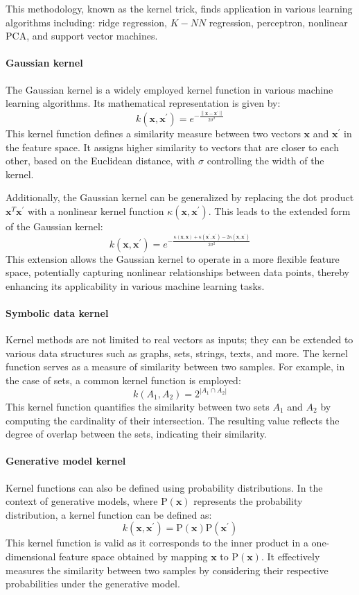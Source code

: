 This methodology, known as the kernel trick, finds application in various learning algorithms including: ridge regression, $K-NN$ regression, perceptron, nonlinear PCA, and support vector machines.

\paragraph*{Gaussian kernel}
The Gaussian kernel is a widely employed kernel function in various machine learning algorithms. 
Its mathematical representation is given by:
\[k(\textbf{x},\textbf{x}^\prime)=e^{-\frac{\left\lVert \textbf{x}-\textbf{x}^\prime\right\rVert}{2\sigma^2} }\]
This kernel function defines a similarity measure between two vectors $\textbf{x}$ and $\textbf{x}^\prime$ in the feature space. 
It assigns higher similarity to vectors that are closer to each other, based on the Euclidean distance, with $\sigma$ controlling the width of the kernel.

Additionally, the Gaussian kernel can be generalized by replacing the dot product $\textbf{x}^T\textbf{x}^\prime$ with a nonlinear kernel function $\kappa (\textbf{x},\textbf{x}^\prime)$. 
This leads to the extended form of the Gaussian kernel:
\[k(\textbf{x},\textbf{x}^\prime)=e^{-\frac{\kappa (\textbf{x},\textbf{x})+\kappa (\textbf{x}^\prime,\textbf{x}^\prime)-2\kappa (\textbf{x},\textbf{x}^\prime)}{2\sigma^2} }\]
This extension allows the Gaussian kernel to operate in a more flexible feature space, potentially capturing nonlinear relationships between data points, thereby enhancing its applicability in various machine learning tasks.

\paragraph*{Symbolic data kernel}
Kernel methods are not limited to real vectors as inputs; they can be extended to various data structures such as graphs, sets, strings, texts, and more. 
The kernel function serves as a measure of similarity between two samples.
For example, in the case of sets, a common kernel function is employed:
\[k(A_1,A_2)=2^{\left\lvert A_1 \cap A_2\right\rvert }\]
This kernel function quantifies the similarity between two sets $A_1$ and $A_2$ by computing the cardinality of their intersection. 
The resulting value reflects the degree of overlap between the sets, indicating their similarity. 

\paragraph*{Generative model kernel}
Kernel functions can also be defined using probability distributions. 
In the context of generative models, where $\text{P}(\textbf{x})$ represents the probability distribution, a kernel function can be defined as:
\[k(\textbf{x},\textbf{x}^\prime)=\text{P}(\textbf{x})\text{P}(\textbf{x}^\prime)\]
This kernel function is valid as it corresponds to the inner product in a one-dimensional feature space obtained by mapping $\textbf{x}$ to $\text{P}(\textbf{x})$. 
It effectively measures the similarity between two samples by considering their respective probabilities under the generative model. 

